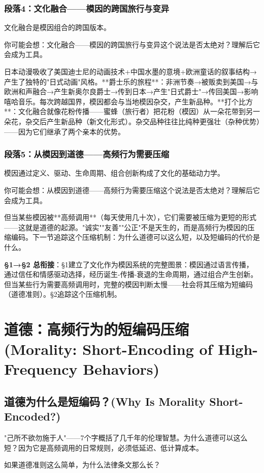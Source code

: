 \documentclass[openany, a4paper, 12pt]{book}
\newenvironment{motivation}{
	\vspace{0.5em}
	\begin{tcolorbox}[
		colback=gray!10,           %
		colframe=gray!60,          %
		title=\textit{本章动机 (Motivation)},
		fonttitle=\bfseries,
		arc=0mm,                   %
		leftrule=3mm               %
		]
		\small \itshape %
	}{
	\end{tcolorbox}
	\vspace{1em}
}
\begin{document}
\begin{motivation}
\begin{motivation}
\begin{motivation}
	\subsubsection*{段落4：文化融合——模因的跨国旅行与变异}
文化融合是模因组合的跨国版本。
	\begin{tcolorbox}[colback=yellow!5, title=\textit{读者行为预测}]
		你可能会想：文化融合——模因的跨国旅行与变异这个说法是否太绝对？理解后它会成为工具。
	\end{tcolorbox}

日本动漫吸收了美国迪士尼的动画技术+中国水墨的意境+欧洲童话的叙事结构→产生了独特的"日式动画"风格。**爵士乐的旅程**：非洲节奏→被贩卖到美国→与欧洲和声融合→产生新奥尔良爵士→传到日本→产生"日式爵士"→传回美国→影响嘻哈音乐。每次跨越国界，模因都会与当地模因杂交，产生新品种。**打个比方**：文化融合就像花粉传播——蜜蜂（旅行者）把花粉（模因）从一朵花带到另一朵花，杂交后产生新品种（新文化形式）。杂交品种往往比纯种更强壮（杂种优势）——因为它们继承了两个亲本的优势。

	\subsubsection*{段落5：从模因到道德——高频行为需要压缩}
模因通过定义、驱动、生命周期、组合创新构成了文化的基础动力学。
	\begin{tcolorbox}[colback=yellow!5, title=\textit{读者行为预测}]
		你可能会想：从模因到道德——高频行为需要压缩这个说法是否太绝对？理解后它会成为工具。
	\end{tcolorbox}

但当某些模因被**高频调用**（每天使用几十次），它们需要被压缩为更短的形式——这就是道德的起源。"诚实""友善""公正"不是天生的，而是高频行为模因的压缩编码。下一节追踪这个压缩机制：为什么道德可以这么短，以及短编码的代价是什么。

	\textbf{§1→§2 总衔接}：§1建立了文化作为模因系统的完整图景：模因通过语言传播，通过信任和情感驱动选择，经历诞生-传播-衰退的生命周期，通过组合产生创新。但当某些行为需要高频调用时，完整的模因判断太慢——社会将其压缩为短编码（道德准则）。§2追踪这个压缩机制。

	
	\section{道德：高频行为的短编码压缩 (Morality: Short-Encoding of High-Frequency Behaviors)}

	\subsection{道德为什么是短编码？(Why Is Morality Short-Encoded?)}
	\begin{motivation}
		"己所不欲勿施于人"——7个字概括了几千年的伦理智慧。为什么道德可以这么短？因为它是高频调用的日常规则，必须低延迟、低计算成本。
	\end{motivation}
	\begin{questionbox}
		如果道德准则这么简单，为什么法律条文那么长？
	\end{questionbox}


\end{motivation}
\end{motivation}
\end{motivation}
\end{document}

